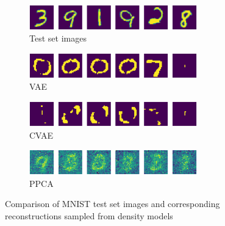 \begin{figure}[H]
	\begin{subfigure}[t]{1\textwidth}
		\centering
		\includegraphics[width = 0.8\textwidth]{figures/ppca/real}
		\caption{Test set images}
		\label{fig:ppca:real}
	\end{subfigure}
	\begin{subfigure}[t]{1\textwidth}
		\centering
		\includegraphics[width = 0.8\textwidth]{figures/vae/sample}
		\caption{VAE}
		\label{fig:ppca:mean}
	\end{subfigure}
	\begin{subfigure}[t]{1\textwidth}
		\centering
		\includegraphics[width = 0.8\textwidth]{figures/cvae/sample}
		\caption{CVAE}
		\label{fig:ppca:sample}
	\end{subfigure}
	\begin{subfigure}[t]{1\textwidth}
		\centering
		\includegraphics[width = 0.8\textwidth]{figures/ppca/sample}
		\caption{PPCA}
		\label{fig:ppca:sample}
	\end{subfigure}
	\caption{Comparison of MNIST test set images and corresponding reconstructions sampled from density models}
	\label{fig:mean:_v_real}
\end{figure}


